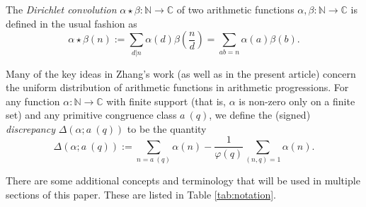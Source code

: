 \documentclass[12pt,a4paper,reqno]{amsart}
\numberwithin{equation}{section}
\theoremstyle{plain}
\theoremstyle{definition}
\newcommand\N{\mathbb{N}}
\newcommand\C{\mathbb{C}}
\renewcommand{\phi}{\varphi}
\begin{document}
The \emph{Dirichlet convolution} $\alpha \star \beta \colon \N \to \C$
of two arithmetic functions $\alpha,\beta \colon \N \to \C$ is defined
in the usual fashion as
$$ \alpha\star\beta(n) := \sum_{d|n} \alpha(d)
\beta\left(\frac{n}{d}\right) =\sum_{ab=n}{\alpha(a)\beta(b)}.$$

Many of the key ideas in Zhang's work (as well as in the present article) concern the
uniform distribution of arithmetic functions in arithmetic
progressions. For any function $\alpha \colon \N \to \C$ with finite
support (that is, $\alpha$ is non-zero only on a finite set) and any
primitive congruence class $a\ (q)$, we define the (signed)
\emph{discrepancy} $\Delta(\alpha; a\ (q))$ to be the quantity
\begin{equation}\label{disc-def}
  \Delta(\alpha; a\ (q)) := \sum_{n = a\ (q)} \alpha(n) - 
  \frac{1}{\phi(q)} \sum_{(n,q)=1} \alpha(n).
\end{equation}

There are some additional concepts and terminology that will be used in multiple sections of this paper.  These are listed in Table \ref{tab:notation}.
\end{document}
